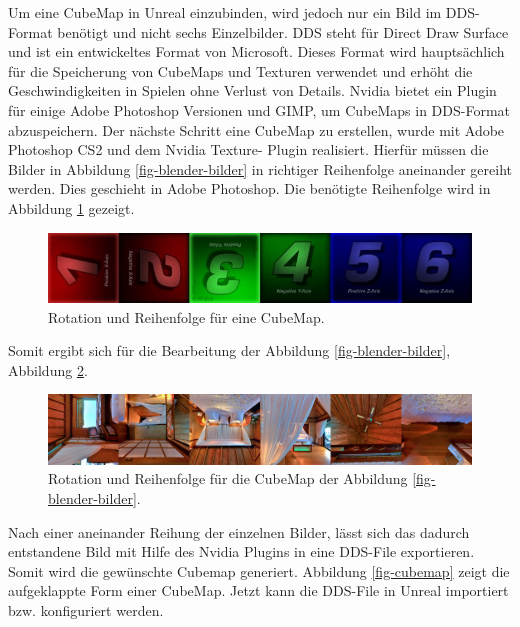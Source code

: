Um eine CubeMap in Unreal einzubinden, wird jedoch nur ein Bild im DDS-Format ben{\"o}tigt und nicht sechs Einzelbilder. 
DDS steht f{\"u}r Direct Draw Surface und ist ein entwickeltes Format von Microsoft. 
Dieses Format wird haupts{\"a}chlich f{\"u}r die Speicherung von CubeMaps und Texturen verwendet und erh{\"o}ht die Geschwindigkeiten in Spielen ohne Verlust von Details\cite{dateiendungen19}.
Nvidia bietet ein Plugin f{\"u}r einige Adobe Photoshop Versionen und GIMP, um CubeMaps in DDS-Format abzuspeichern.
Der n{\"a}chste Schritt eine CubeMap zu erstellen, wurde mit Adobe Photoshop CS2 und dem Nvidia Texture- Plugin realisiert. 
Hierf{\"u}r m{\"u}ssen die Bilder in Abbildung \ref{fig-blender-bilder} in richtiger Reihenfolge aneinander gereiht werden. 
Dies geschieht in Adobe Photoshop. 
Die ben{\"o}tigte Reihenfolge wird in Abbildung \ref{fig-rotation} gezeigt. \\

\begin{figure}[H] \centering
\includegraphics[width=\textwidth]{Images/rotation.png} 
\caption[Rotation und Reihenfolge f{\"u}r eine CubeMap]{Rotation und Reihenfolge f{\"u}r eine CubeMap\cite{franczak19}.}
\label{fig-rotation} 
\end{figure}


Somit ergibt sich f{\"u}r die Bearbeitung der Abbildung \ref{fig-blender-bilder}, Abbildung \ref{fig-blender-bilder2}. \\

\begin{figure}[H] \centering
\includegraphics[width=\textwidth]{Images/blender-bilder2.png} 
\caption{Rotation und Reihenfolge f{\"u}r die CubeMap der Abbildung \ref{fig-blender-bilder}.}
\label{fig-blender-bilder2} 
\end{figure}


Nach einer aneinander Reihung der einzelnen Bilder, l{\"a}sst sich das dadurch entstandene Bild mit Hilfe des Nvidia Plugins in eine DDS-File exportieren. 
Somit wird die gew{\"u}nschte Cubemap generiert.
Abbildung \ref{fig-cubemap} zeigt die aufgeklappte Form einer CubeMap.
Jetzt kann die DDS-File in Unreal importiert bzw. konfiguriert werden. \\

